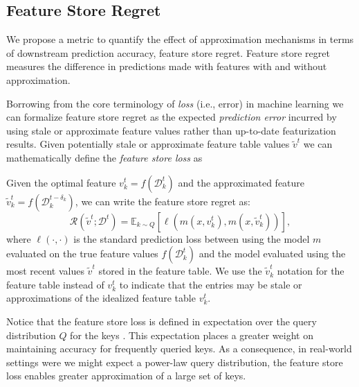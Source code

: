 


\subsection{Feature Store Regret}
We propose a metric to quantify the effect of approximation mechanisms in terms of downstream prediction accuracy, feature store regret. Feature store regret measures the difference in predictions made with features with and without approximation. 

Borrowing from the core terminology of \emph{loss} (i.e., error) in machine learning we can formalize feature store regret as the expected \emph{prediction error} incurred by using stale or approximate feature values rather than up-to-date featurization results. 
Given potentially stale or approximate feature table values $\tilde{v}^t$
we can mathematically define the \emph{feature store loss} as

Given the optimal feature $v_k^t=f(\mathcal{D}_k^t)$ and the approximated feature $\tilde{v}_k^t=f(\mathcal{D}_k^{t-\delta_k})$, we can write the feature store regret as: 
\begin{equation}
    \mathcal{R}(\tilde{v}^t; \mathcal{D}^t) = 
    \mathbb{E}_{k\sim Q}\left[\ell\left(
    m\left(x, v^t_k \right),
    m\left(x, \tilde{v}^t_k \right)
    \right)\right],
\label{eq:feature-store-regret}
\end{equation}
where $\ell(\cdot, \cdot)$ is the standard prediction loss between using the model $m$ evaluated on the true feature values $f\left(\mathcal{D}^t_k \right)$ and the model evaluated using the most recent values $\tilde{v}^t$ stored in the feature table.
We use the $\tilde{v}^t_k$ notation for the feature table instead of $v^t_k$ to indicate that the entries may be stale or approximations of the idealized feature table $v^t_k$.


Notice that the feature store loss is defined in expectation over the query distribution $Q$ for the keys .  
This expectation places a greater weight on maintaining accuracy for frequently queried keys.
As a consequence, in real-world settings were we might expect a power-law query distribution, the feature store loss enables 
greater approximation of a large set of keys.

